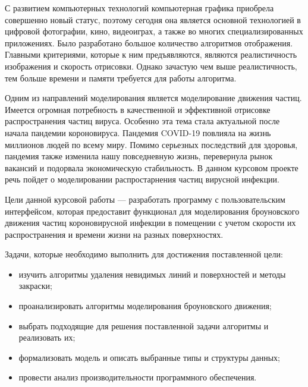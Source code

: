 \Introduction

С развитием компьютерных технологий компьютерная графика приобрела совершенно новый статус, поэтому сегодня она является основной технологией в цифровой фотографии, кино, видеоиграх, а также во многих специализированных приложениях. Было разработано большое количество алгоритмов отображения. Главными критериями, которые к ним предъявляются, являются реалистичность изображения и скорость отрисовки. Однако зачастую чем выше реалистичность, тем больше времени и памяти требуется для работы алгоритма.

Одним из направлений моделирования является моделирование движения частиц. Имеется огромная потребность в качественной и эффективной отрисовке распространения частиц вируса. Особенно эта тема стала актуальной после начала пандемии короновируса. Пандемия COVID-19 повлияла на жизнь миллионов людей по всему миру. Помимо серьезных последствий для здоровья, пандемия также изменила нашу повседневную жизнь, перевернула рынок вакансий и подорвала экономическую стабильность. В данном курсовом проекте речь пойдет о моделировании распростарнения частиц вирусной инфекции.

Цели данной курсовой работы --- разработать программу с пользовательским интерфейсом, которая предоставит функционал для моделирования броуновского движения частиц короновирусной инфекции в помещении с учетом скорости их распространения и времени жизни на разных поверхностях.

Задачи, которые необходимо выполнить для достижения поставленной цели:

\begin{itemize}
	\item изучить алгоритмы удаления невидимых линий и поверхностей и методы закраски;
	\item проанализировать алгоритмы моделирования броуновского движения;
	\item выбрать подходящие для решения поставленной задачи алгоритмы и реализовать их;
	\item формализовать модель и описать выбранные типы и структуры данных;
	\item провести анализ производительности программного обеспечения.
\end{itemize}